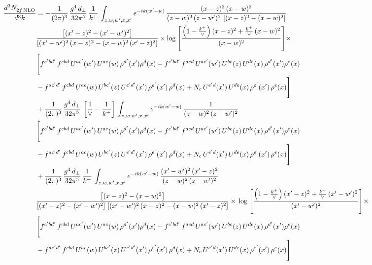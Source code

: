 \documentclass[9pt]{article}
\numberwithin{equation}{section}
\begin{document}
\begin{align}
    \frac{d^{3}N_{2f\,\rm NLO}^{\rm}}{d^{3}k}  & =   - \frac{1}{(2\pi)^{3}}\, \frac{g^{4}\,d_{\perp}}{32\pi^{5}}\,\frac{1}{k^{+}}\,\int_{z,w,w^{\prime},x,x'} e^{-ik(w^{\prime}-w)}\,\frac{(x-z)^{2}\, (x-w)^{2}}{(z-w)^{2}\, (z-w')^{2}\,\left[(x-z)^{2} - (x-w)^{2}\right]}\notag \\ & \frac{\left[(x'-z)^{2}-(x'-w')^{2}\right]}{\left[(x'-w')^{2}\, (x-z)^{2} - (x-w)^{2}\, (x'-z)^{2}\right]}\times \log{\left[\frac{\left(1-\frac{k^{+}}{\vee}\right)(x-z)^{2}+\frac{k^{+}}{\vee}\,(x-w)^{2}}{(x-w)^{2}}\right]}\times\notag \\ & \Bigg[f^{c'bd'}\,f^{cbd}\, U^{ac'}(w')\,U^{ac}(w)\,\rho^{d'}(x')\rho^{d}(x)- f^{c'bd'}\,f^{acd}\,U^{ac'}(w')\,U^{bc}(z)\,U^{de}(x)\,\rho^{d'}(x')\rho^{e}(x) \notag \\ & -f^{ac'd'}\,f^{cbd}\,U^{ac}(w)\,U^{bc'}(z)\,U^{e'd'}(x')\,\rho^{e'}(x')\,\rho^{d}(x) +N_{c}\,U^{e'd}(x')\,U^{de}(x)\,\rho^{e'}(x')\,\rho^{e}(x)\Bigg]  \notag \\
& + \frac{1}{(2\pi)^{3}}\, \frac{g^{4}\,d_{\perp}}{32\pi^{5}}\,\left[\frac{1}{\vee} - \frac{1}{k^{+}}\right]\,\int_{z,w,w^{\prime},x,x'} e^{-ik(w^{\prime}-w)}\,\frac{1}{(z-w)^{2}\, (z-w')^{2}}\notag \\ & \Bigg[f^{c'bd'}\,f^{cbd}\, U^{ac'}(w')\,U^{ac}(w)\,\rho^{d'}(x')\rho^{d}(x)- f^{c'bd'}\,f^{acd}\,U^{ac'}(w')\,U^{bc}(z)\,U^{de}(x)\,\rho^{d'}(x')\rho^{e}(x) \notag \\ & -f^{ac'd'}\,f^{cbd}\,U^{ac}(w)\,U^{bc'}(z)\,U^{e'd'}(x')\,\rho^{e'}(x')\,\rho^{d}(x) +N_{c}\,U^{e'd}(x')\,U^{de}(x)\,\rho^{e'}(x')\,\rho^{e}(x)\Bigg]  \notag \\
& + \frac{1}{(2\pi)^{3}}\, \frac{g^{4}\,d_{\perp}}{32\pi^{5}}\,\frac{1}{k^{+}}\,\int_{z,w,w^{\prime},x,x'} e^{-ik(w^{\prime}-w)}\,\frac{(x'-w')^{2}\, (x'-z)^{2}}{(z-w)^{2}\, (z-w')^{2}}\notag \\ & \frac{\left[(x-z)^{2} - (x-w)^{2}\right]}{\left[(x'-z)^{2} - (x'-w')^{2}\right]\, \left[(x'-w')^{2}\, (x - z)^{2} - (x-w)^{2}\,(x'-z)^{2}\right]}\times\, \log{\left[\frac{\left(1-\frac{k^{+}}{\vee}\right)(x'-z)^{2}+\frac{k^{+}}{\vee}\,(x'-w')^{2}}{(x'-w')^{2}}\right]}\times \notag \\ &  \Bigg[f^{c'bd'}\,f^{cbd}\, U^{ac'}(w')\,U^{ac}(w)\,\rho^{d'}(x')\rho^{d}(x)- f^{c'bd'}\,f^{acd}\,U^{ac'}(w')\,U^{bc}(z)\,U^{de}(x)\,\rho^{d'}(x')\rho^{e}(x) \notag \\ & -f^{ac'd'}\,f^{cbd}\,U^{ac}(w)\,U^{bc'}(z)\,U^{e'd'}(x')\,\rho^{e'}(x')\,\rho^{d}(x) +N_{c}\,U^{e'd}(x')\,U^{de}(x)\,\rho^{e'}(x')\,\rho^{e}(x)\Bigg]
\end{align}
\end{document}

